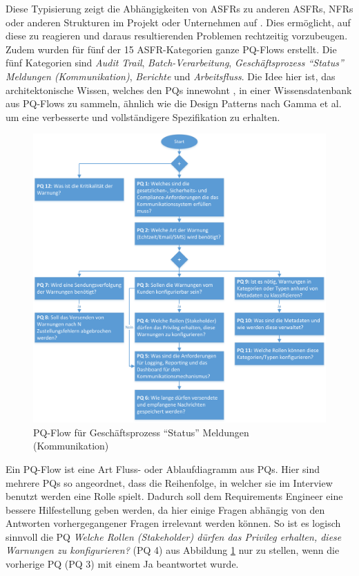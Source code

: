 Diese Typisierung zeigt die Abh\"angigkeiten von ASFRs zu anderen ASFRs, NFRs oder anderen Strukturen im Projekt oder Unternehmen auf \cite{Ros02}. Dies erm\"oglicht, auf diese zu reagieren und daraus resultierenden Problemen rechtzeitig vorzubeugen. \\

Zudem wurden f\"ur f\"unf der 15 ASFR-Kategorien ganze PQ-Flows erstellt. Die f\"unf Kategorien sind \textit{Audit Trail}, \textit{Batch-Verarbeitung}, \textit{Gesch\"aftsprozess ``Status'' Meldungen (Kommunikation)}, \textit{Berichte} und \textit{Arbeitsfluss}. Die Idee hier ist, das architektonische Wissen, welches den PQs innewohnt \cite{Ros02}, in einer Wissensdatenbank aus PQ-Flows zu sammeln, \"ahnlich wie die Design Patterns nach Gamma et al. \cite{Ros03} um eine verbesserte und vollst\"andigere Spezifikation zu erhalten. \\

\begin{figure}[h]
	\centering
	\includegraphics[scale=0.45]{pqflow_communication.png} 
	\caption{PQ-Flow f\"ur Gesch\"aftsprozess ``Status'' Meldungen (Kommunikation) \cite{Ros01}}\label{fig_pqflow_communication}
\end{figure}

Ein PQ-Flow ist eine Art Fluss- oder Ablaufdiagramm aus PQs. Hier sind mehrere PQs so angeordnet, dass die Reihenfolge, in welcher sie im Interview benutzt werden eine Rolle spielt. Dadurch soll dem Requirements Engineer eine bessere Hilfestellung geben werden, da hier einige Fragen abh\"angig von den Antworten vorhergegangener Fragen irrelevant werden k\"onnen. So ist es logisch sinnvoll die PQ \textit{Welche Rollen (Stakeholder) d\"urfen das Privileg erhalten, diese Warnungen zu konfigurieren?} (PQ 4) aus Abbildung \ref{fig_pqflow_communication} nur zu stellen, wenn die vorherige PQ (PQ 3) mit einem Ja beantwortet wurde. \\

